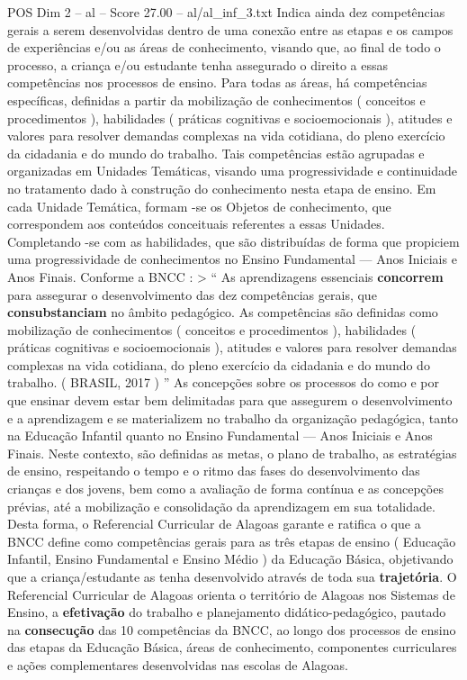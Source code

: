 \begin{textsample}{POS Dim 2 – al – Score 27.00 – al/al\_inf\_3.txt}
Indica ainda dez competências gerais a serem desenvolvidas dentro de uma conexão entre as etapas e os campos de experiências e/ou as áreas de conhecimento, visando que, ao final de todo o processo, a criança e/ou estudante tenha assegurado o direito a essas competências nos processos de ensino.
Para todas as áreas, há competências específicas, definidas a partir da mobilização de conhecimentos ( conceitos e procedimentos ), habilidades ( práticas cognitivas e socioemocionais ), atitudes e valores para resolver demandas complexas na vida cotidiana, do pleno exercício da cidadania e do mundo do trabalho.
Tais competências estão agrupadas e organizadas em Unidades Temáticas, visando uma progressividade e continuidade no tratamento dado à construção do conhecimento nesta etapa de ensino.
Em cada Unidade Temática, formam -se os Objetos de conhecimento, que correspondem aos conteúdos conceituais referentes a essas Unidades.
Completando -se com as habilidades, que são distribuídas de forma que propiciem uma progressividade de conhecimentos no Ensino Fundamental — Anos Iniciais e Anos Finais.
Conforme a BNCC : > “ As aprendizagens essenciais \textbf{concorrem} para assegurar o desenvolvimento das dez competências gerais, que \textbf{consubstanciam} no âmbito pedagógico.
As competências são definidas como mobilização de conhecimentos ( conceitos e procedimentos ), habilidades ( práticas cognitivas e socioemocionais ), atitudes e valores para resolver demandas complexas na vida cotidiana, do pleno exercício da cidadania e do mundo do trabalho. ( BRASIL, 2017 ) ” As concepções sobre os processos do como e por que ensinar devem estar bem delimitadas para que assegurem o desenvolvimento e a aprendizagem e se materializem no trabalho da organização pedagógica, tanto na Educação Infantil quanto no Ensino Fundamental — Anos Iniciais e Anos Finais.
Neste contexto, são definidas as metas, o plano de trabalho, as estratégias de ensino, respeitando o tempo e o ritmo das fases do desenvolvimento das crianças e dos jovens, bem como a avaliação de forma contínua e as concepções prévias, até a mobilização e consolidação da aprendizagem em sua totalidade.
Desta forma, o Referencial Curricular de Alagoas garante e ratifica o que a BNCC define como competências gerais para as três etapas de ensino ( Educação Infantil, Ensino Fundamental e Ensino Médio ) da Educação Básica, objetivando que a criança/estudante as tenha desenvolvido através de toda sua \textbf{trajetória}.
O Referencial Curricular de Alagoas orienta o território de Alagoas nos Sistemas de Ensino, a \textbf{efetivação} do trabalho e planejamento didático-pedagógico, pautado na \textbf{consecução} das 10 competências da BNCC, ao longo dos processos de ensino das etapas da Educação Básica, áreas de conhecimento, componentes curriculares e ações complementares desenvolvidas nas escolas de Alagoas.

\end{textsample}
